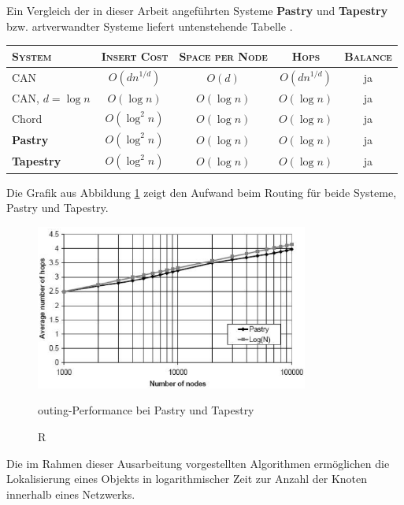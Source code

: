 Ein Vergleich der in dieser Arbeit angeführten Systeme \textbf{Pastry} und
\textbf{Tapestry} bzw. artverwandter Systeme liefert untenstehende Tabelle \cite{HildrumKRZ02}.
\\
\begin{table}[H]
\begin{tabular}{|l|c|c|c|c|}
\hline
\textsc{System} & \textsc{Insert Cost} & \textsc{Space per Node} & \textsc{Hops}
& \textsc{Balance}\\ \hline
\hline
CAN & $O(d n^{1/d})$ & $O(d)$ & $O(d n^{1/d})$ & ja\\
CAN, $d = \log n$ & $O(\log n)$ & $O(\log n)$ & $O(\log n)$ & ja\\
Chord & $O(\log^2 n)$ & $O(\log n)$ & $O(\log n)$ & ja\\
\textbf{Pastry} & $O(\log^2 n)$ & $O(\log n)$ & $O(\log n)$ & ja\\
\textbf{Tapestry} & $O(\log^2 n)$ & $O(\log n)$ & $O(\log n)$ & ja\\
\hline
\end{tabular}
\end{table}
Die Grafik aus Abbildung \ref{fig:performance} zeigt den Aufwand beim Routing
für beide Systeme, Pastry und Tapestry.
\begin{figure}
  \centering 
  \includegraphics[width=0.8\textwidth]{../images/performance}
  \caption[Pastry und Tapestry: Performance]Routing-Performance bei Pastry und Tapestry \cite{Pastry-Middleware}
  \label{fig:performance}
\end{figure}
Die im Rahmen dieser Ausarbeitung vorgestellten Algorithmen ermöglichen die
Lokalisierung eines Objekts in logarithmischer Zeit zur Anzahl der Knoten
innerhalb eines Netzwerks.
